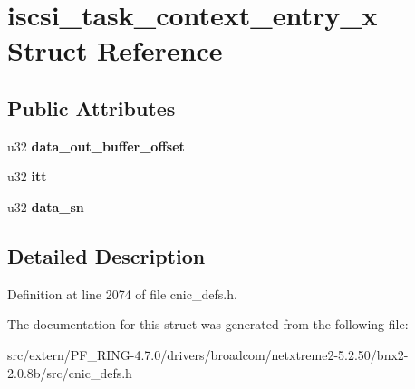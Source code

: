 \hypertarget{structiscsi__task__context__entry__x}{
\section{iscsi\_\-task\_\-context\_\-entry\_\-x Struct Reference}
\label{structiscsi__task__context__entry__x}
}
\subsection*{Public Attributes}
\begin{DoxyCompactItemize}
\item 
\hypertarget{structiscsi__task__context__entry__x_a51463ed0ce762de7b405f5c407906800}{
u32 {\bfseries data\_\-out\_\-buffer\_\-offset}}
\label{structiscsi__task__context__entry__x_a51463ed0ce762de7b405f5c407906800}

\item 
\hypertarget{structiscsi__task__context__entry__x_a4a52b1f1f4291545251fd8d1602761eb}{
u32 {\bfseries itt}}
\label{structiscsi__task__context__entry__x_a4a52b1f1f4291545251fd8d1602761eb}

\item 
\hypertarget{structiscsi__task__context__entry__x_aa81dceb5d03bca7b215af8ce0673ac31}{
u32 {\bfseries data\_\-sn}}
\label{structiscsi__task__context__entry__x_aa81dceb5d03bca7b215af8ce0673ac31}

\end{DoxyCompactItemize}


\subsection{Detailed Description}


Definition at line 2074 of file cnic\_\-defs.h.



The documentation for this struct was generated from the following file:\begin{DoxyCompactItemize}
\item 
src/extern/PF\_\-RING-\/4.7.0/drivers/broadcom/netxtreme2-\/5.2.50/bnx2-\/2.0.8b/src/cnic\_\-defs.h\end{DoxyCompactItemize}
